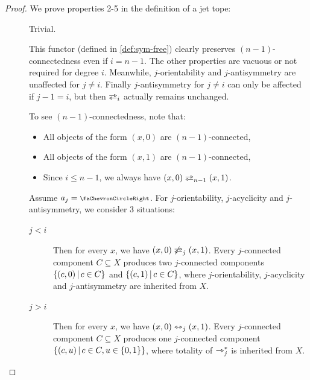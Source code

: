 \documentclass[a4paper]{memoir}
\begin{document}
\begin{proof}
	We prove properties 2-5 in the definition of a jet tope:
	\begin{description}
		\item[] Trivial.
		\item[] This functor (defined in \cref{def:sym-free}) clearly preserves $(n-1)$-connectedness even if $i = n-1$.
		The other properties are vacuous or not required for degree $i$.
		Meanwhile, $j$-orientability and $j$-antisymmetry are unaffected for $j \neq i$.
		Finally $j$-antisymmetry for $j \neq i$ can only be affected if $j-1 = i$, but then $\infrajetsym_{i}$ actually remains unchanged.
		\item[] To see $(n-1)$-connectedness, note that:
		\begin{itemize}
			\item All objects of the form $(x, 0)$ are $(n-1)$-connected,
			\item All objects of the form $(x, 1)$ are $(n-1)$-connected,
			\item Since $i \leq n-1$, we always have $(x, 0) \infrajet_{n-1} (x, 1)$.
		\end{itemize}
		Assume $a_j = \ypolar$. For $j$-orientability, $j$-acyclicity and $j$-antisymmetry, we consider 3 situations:
		\begin{description}
			\item[$j < i$] Then for every $x$, we have $(x, 0) \not\infrajet_j (x, 1)$. Every $j$-connected component $C \subseteq X$ produces two $j$-connected components $\mathopen{}\left\{ (c, 0) \,\middle|\, c \in C \right\}\mathclose{}$ and $\mathopen{}\left\{ (c, 1) \,\middle|\, c \in C \right\}\mathclose{}$, where $j$-orientability, $j$-acyclicity and $j$-antisymmetry are inherited from $X$.
			\item[$j > i$] Then for every $x$, we have $(x, 0) \leftrightarrowtriangle_j (x, 1)$. Every $j$-connected component $C \subseteq X$ produces one $j$-connected component $\mathopen{}\left\{ (c, u) \,\middle|\, c \in C, u \in \mathopen{}\left\{ 0, 1 \right\}\mathclose{} \right\}\mathclose{}$, where totality of $\rightarrowtriangle_j^*$ is inherited from $X$.
			

\end{description}
\end{description}
\end{proof}
\end{document}
